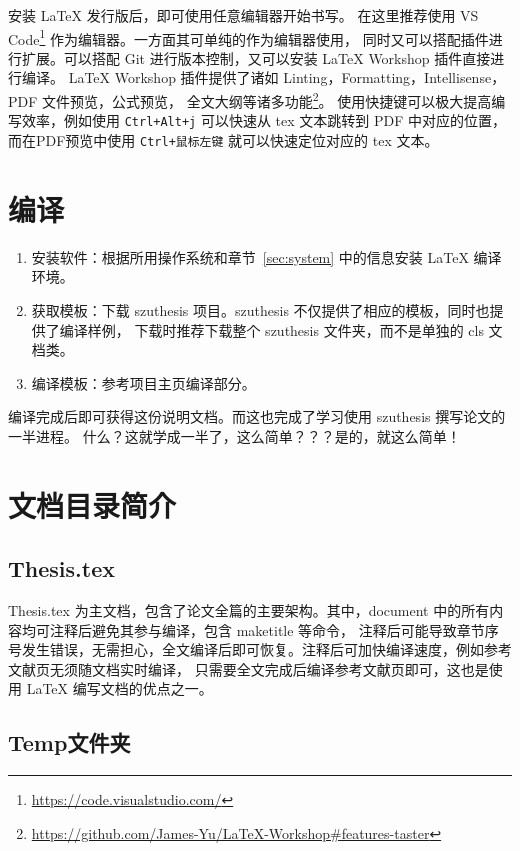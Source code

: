 安装 \LaTeX{} 发行版后，即可使用任意编辑器开始书写。
在这里推荐使用 VS Code\footnote{\url{https://code.visualstudio.com/}} 作为编辑器。一方面其可单纯的作为编辑器使用，
同时又可以搭配插件进行扩展。可以搭配 Git 进行版本控制，又可以安装 LaTeX Workshop 插件直接进行编译。
LaTeX Workshop 插件提供了诸如 Linting，Formatting，Intellisense，PDF 文件预览，公式预览，
全文大纲等诸多功能\footnote{\url{https://github.com/James-Yu/LaTeX-Workshop\#features-taster}}。
使用快捷键可以极大提高编写效率，例如使用 \lstinline!Ctrl+Alt+j! 可以快速从 tex 文本跳转到 PDF 中对应的位置，
而在PDF预览中使用 \lstinline!Ctrl+鼠标左键! 就可以快速定位对应的 tex 文本。


\section{编译}

\begin{enumerate}[wide=\parindent]
    \item 安装软件：根据所用操作系统和章节~\ref{sec:system} 中的信息安装 \LaTeX{} 编译环境。

    \item 获取模板：下载 szuthesis 项目。szuthesis 不仅提供了相应的模板，同时也提供了编译样例，
          下载时推荐下载整个 szuthesis 文件夹，而不是单独的 cls 文档类。

    \item 编译模板：参考项目主页编译部分。
\end{enumerate}

编译完成后即可获得这份说明文档。而这也完成了学习使用 szuthesis 撰写论文的一半进程。
什么？这就学成一半了，这么简单？？？是的，就这么简单！


\section{文档目录简介}

\subsection{Thesis.tex}

Thesis.tex 为主文档，包含了论文全篇的主要架构。其中，document 中的所有内容均可注释后避免其参与编译，包含 maketitle 等命令，
注释后可能导致章节序号发生错误，无需担心，全文编译后即可恢复。注释后可加快编译速度，例如参考文献页无须随文档实时编译，
只需要全文完成后编译参考文献页即可，这也是使用 \LaTeX{} 编写文档的优点之一。

\subsection{Temp文件夹}

